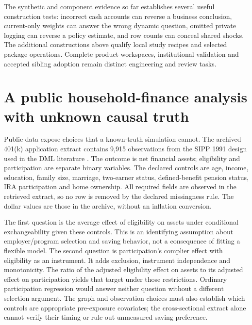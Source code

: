 The synthetic and component evidence so far establishes several useful construction tests:
incorrect cash accounts can reverse a business conclusion, current-only
weights can answer the wrong dynamic question, omitted private logging
can reverse a policy estimate, and row counts can conceal shared shocks.
The additional constructions above qualify local study recipes and selected
package operations. Complete product workspaces, institutional validation
and accepted sibling adoption remain distinct engineering and review tasks.



\section{A public household-finance analysis with unknown causal truth}
\label{s5:public-finance}
Public data expose choices that a known-truth simulation cannot. The archived
401(k) application extract contains 9,915 observations from the SIPP 1991
design used in the DML literature \citep[Section 6.2]{dml2018,public401k}.
The outcome is net financial assets; eligibility and participation are
separate binary variables. The declared controls are age, income, education,
family size, marriage, two-earner status, defined-benefit pension status,
IRA participation and home ownership. All required fields are observed in
the retrieved extract, so no row is removed by the declared missingness rule.
The dollar values are those in the archive, without an inflation conversion.

The first question is the average effect of eligibility on assets under
conditional exchangeability given these controls. This is an identifying
assumption about employer/program selection and saving behavior, not a
consequence of fitting a flexible model. The second question is participation's
complier effect with eligibility as an instrument. It adds exclusion,
instrument independence and monotonicity. The ratio of the adjusted
eligibility effect on assets to its adjusted effect on participation yields
that target under those restrictions. Ordinary participation regression
would answer neither question without a different selection argument.
The graph and observation choices must also establish which controls are
appropriate pre-exposure covariates; the cross-sectional extract alone cannot
verify their timing or rule out unmeasured saving preference.

